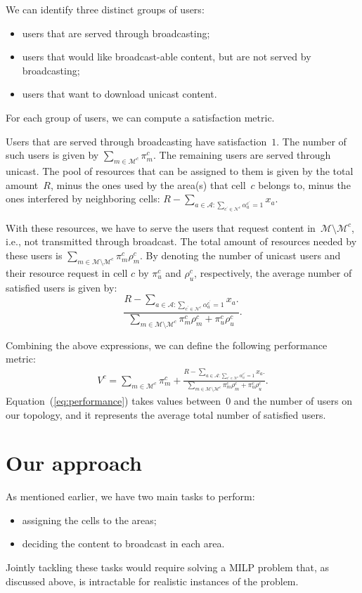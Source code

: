 \documentclass[10pt, conference, compsocconf]{IEEEtran}
\newcommand{\Ac}{\mathcal{A}}
\newcommand{\Mc}{\mathcal{M}}
\newcommand{\Nc}{\mathcal{N}}
\numberwithin{equation}{section}
\begin{document}
We can identify three distinct groups of users:
\begin{itemize}
\item users that are served through broadcasting;
\item users that would like broadcast-able content, but are not served by broadcasting;
\item users that want to download unicast content.
\end{itemize}
For each group of users, we can compute a satisfaction metric.

Users that are served through broadcasting have satisfaction~$1$. The number of such users is given by $\sum_{m\in \Mc^c}\pi^c_m$.
The remaining users are served through unicast. The pool of resources that can be assigned to them is
given by the total amount~$R$, minus the ones used by the area(s) that cell~$c$ belongs to, minus the ones
interfered by neighboring cells: $R-\sum_{a\in\Ac\colon\sum_{c^{\prime}\in \Nc^c}\alpha^{c^{\prime}}_a= 1}x_a$.


With these resources, we have to serve the users that request content in~$\Mc\setminus \Mc^c$, i.e.,
not transmitted through broadcast.
The total amount of resources needed by these users is $\sum_{m\in\Mc\setminus \Mc^c}\pi^c_m\rho^c_m$.
By denoting the number of unicast users and their resource request in
cell $c$ by
$\pi^c_u$ and $\rho^c_u$, respectively, the 
average number of satisfied users is given by:
\begin{equation}
\nonumber
\frac{
R-\sum_{a\in\Ac\colon\sum_{c^{\prime}\in \Nc^c}\alpha^{c^{\prime}}_a= 1}x_a.
}{
\sum_{m\in\Mc\setminus \Mc^c}\pi^c_m\rho^c_m + \pi^c_u \rho^c_u
}.
\end{equation}

Combining the above expressions, we can define the following
performance metric:
\begin{multline}
\label{eq:performance}
V^c=\sum_{m\in \Mc^c}\pi^c_m +\frac{
R-\sum_{a\in\Ac\colon\sum_{c^{\prime}\in \Nc^c}\alpha^{c^{\prime}}_a= 1}x_a.
}{
\sum_{m\in\Mc\setminus \Mc^c}\pi^c_m\rho^c_m + \pi^c_u \rho^c_u
}.
\end{multline}
Equation~(\ref{eq:performance}) takes values between~$0$ and the
number of users on our topology, and it represents the average total number
of satisfied users.



\section{Our approach
\label{sec:algos}
}
As mentioned earlier, we have two main tasks to perform:
\begin{itemize}
\item assigning the cells to the areas;
\item deciding the content to broadcast in each area.
\end{itemize}
Jointly tackling these tasks would require solving a MILP problem that, as discussed above,
is intractable for realistic instances of the problem.
\end{document}
